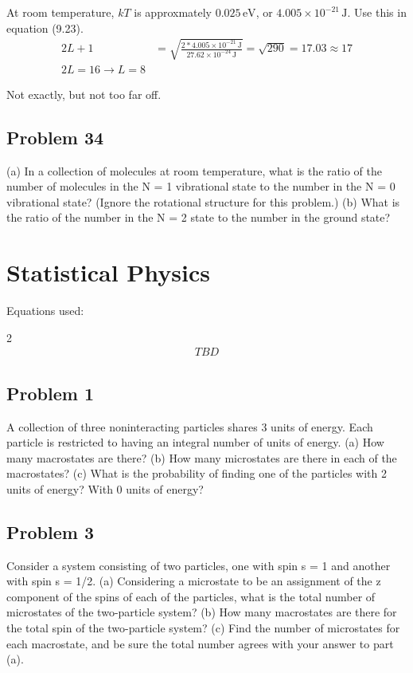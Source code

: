 \documentclass[12pt]{report}
\newcommand{\E}[1]{\times 10^{#1}}
\begin{document}
        At room temperature, $kT$ is approxmately $0.025\,\unit{\eV}$, or $4.005\E{-21}\,\unit{\joule}$.
        Use this in equation (9.23).
        \begin{align}
            2L + 1  &=  \sqrt{\frac{2*4.005\E{-21}\,\unit{\joule}}{27.62\E{-24}\,\unit{\joule}}}
                =   \sqrt{290}
                =   17.03
                \approx 17\\
            2L  =   16 \to L = 8
        \end{align}

        Not exactly, but not too far off.
    \pagebreak

\section{Problem 34}
    (a) In a collection of  molecules at room temperature, what is the ratio of the number of molecules in the N = 1 vibrational state to the number in the N = 0 vibrational state? 
    (Ignore the rotational structure for this problem.) 
    (b) What is the ratio of the number in the N = 2 state to the number in the ground state?

\chapter{Statistical Physics}
Equations used:
\begin{multicols}{2}
    \scriptsize
    \begin{gather*}
        TBD
    \end{gather*}
    \normalsize
\end{multicols}
\pagebreak

\section{Problem 1} %
    A collection of three noninteracting particles shares 3 units of energy. 
    Each particle is restricted to having an integral number of units of energy. 
    (a) How many macrostates are there? 
    (b) How many microstates are there in each of the macrostates? 
    (c) What is the probability of ﬁnding one of the particles with 2 units of energy? 
    With 0 units of energy?

\section{Problem 3}
    Consider a system consisting of two particles, one with spin s = 1 and another with spin s = 1/2. 
    (a) Considering a microstate to be an assignment of the z component of the spins of each of the particles, what is the total number of microstates of the two-particle system? 
    (b) How many macrostates are there for the total spin of the two-particle system? 
    (c) Find the number of microstates for each macrostate, and be sure the total number agrees with your answer to part (a).
\end{document}
